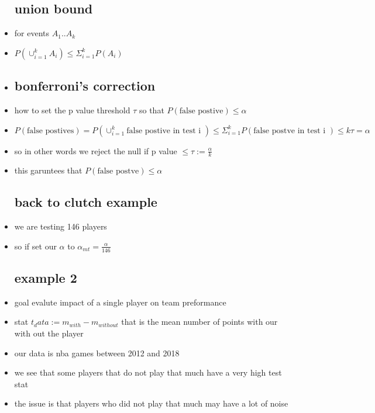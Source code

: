 \documentclass{article}
\begin{document}
\begin{itemize}
\subsection*{union bound}
\item for events $A_1..A_k$
\item $P(\cup_{i=1}^{k}A_i)\leq \Sigma_{i=1}^{k}P(A_i)$
\item 
\subsection*{bonferroni's correction}
\item how to set the p value threshold $\tau$ so that $P(\text{false postive}) \leq \alpha$
\item $P(\text{false postives})=P(\cup_{i=1}^{k}\text{false postive in test i })\leq \Sigma_{i=1}^{k}P(\text{false postve in test i })\leq k\tau=\alpha$
\item so in other words we reject the null if p value $\leq \tau :=\frac{\alpha}{k}$
\item this garuntees that $P(\text{false postve})\leq \alpha$
\subsection*{back to clutch example}
\item we are testing 146 players 
\item so if set our $\alpha$ to $\alpha_{mt}=\frac{\alpha}{146}$
\subsection*{example 2 }
\item goal evalute impact of a single player on team preformance 
\item stat $t_data:=m_{with}-m_{without}$ that is the mean number of points with our with out the player
\item our data is nba games between 2012 and 2018
\item we see that some players that do not play that much have a very high test stat 
\item the issue is that players who did not play that much may have a lot of noise 

\end{itemize}
\end{document}
